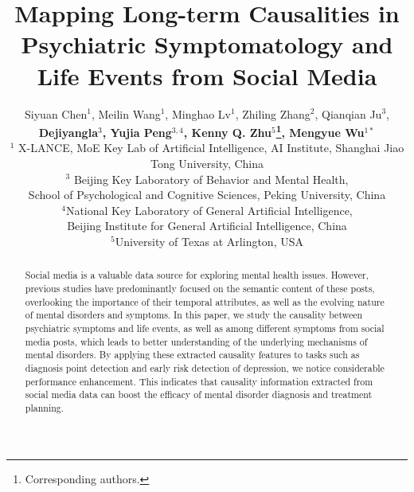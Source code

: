 \documentclass[11pt]{article}
\title{Mapping Long-term Causalities in Psychiatric Symptomatology and Life Events from Social Media}
\author{Siyuan Chen$^1$, Meilin Wang$^1$, Minghao Lv$^1$, Zhiling Zhang$^2$, Qianqian Ju$^3$, \\ \textbf{Dejiyangla$^3$, Yujia Peng$^{3,4}$, Kenny Q. Zhu$^5$\thanks{Corresponding
authors.}, 
Mengyue Wu$^{1*}$} \\
$^1$ X-LANCE,
MoE Key Lab of Artificial Intelligence, AI Institute,
Shanghai Jiao Tong University, China \\
$^3$ Beijing Key Laboratory of Behavior and Mental Health, \\
School of Psychological and Cognitive Sciences, 
Peking University, China \\
$^4$National Key Laboratory of General Artificial Intelligence,\\ Beijing Institute for General Artificial Intelligence, China\\
$^5$University of Texas at Arlington, USA \\
}
\begin{document}
\maketitle
{}
\begin{abstract}
Social media is a valuable data source for exploring mental health issues. 
However, previous studies have predominantly focused on the semantic content of these posts, overlooking the importance of their temporal attributes, as well as the evolving nature of mental disorders and symptoms.
In this paper, we study the causality between psychiatric symptoms and life events, 
as well as among different symptoms from social media posts, which leads to better understanding
of the underlying mechanisms of mental disorders. By applying these extracted causality features 
to tasks such as diagnosis point detection and early risk detection of depression, 
we notice considerable performance enhancement. This indicates that causality information 
extracted from social media data can boost the efficacy of mental disorder diagnosis 
and treatment planning.
\end{abstract}





% 






\appendix

\end{document}
